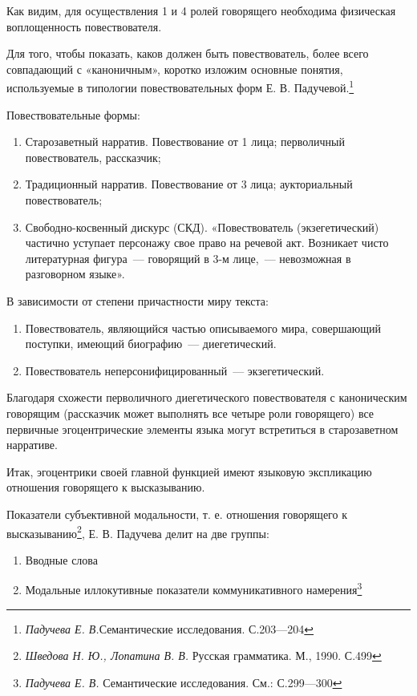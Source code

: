 \documentclass{kursa4}
\begin{document}
{      \bigskip

      Как видим, для осуществления 1 и 4 ролей говорящего необходима физическая воплощенность повествователя. 

      Для того, чтобы показать, каков должен быть повествователь, более всего совпадающий с «каноничным», коротко изложим основные понятия, используемые в типологии повествовательных форм Е. В. Падучевой.\footnote{\textit{Падучева Е. В.}Семантические исследования. С.203—204} \newline

      Повествовательные формы:
      \begin{enumerate}
        \item Старозаветный нарратив. Повествование от 1 лица; перволичный повествователь, рассказчик; 
        \item Традиционный нарратив. Повествование от 3 лица; аукториальный повествователь; \item Свободно-косвенный дискурс (СКД). «Повествователь (экзегетический) частично уступает персонажу свое право на речевой акт. Возникает чисто литературная фигура~--- говорящий в 3-м лице,~--- невозможная в разговорном языке». \end{enumerate}

      В зависимости от степени причастности миру текста: \begin{enumerate}
        \item Повествователь, являющийся частью описываемого мира, совершающий поступки, имеющий биографию~--- диегетический. 
        \item Повествователь неперсонифицированный~--- экзегетический. 
       \end{enumerate} 

      Благодаря схожести перволичного диегетического повествователя с каноническим говорящим (рассказчик может выполнять все четыре роли говорящего) все первичные эгоцентрические элементы языка могут встретиться в старозаветном нарративе. 

      Итак, эгоцентрики своей главной функцией имеют языковую экспликацию отношения говорящего к высказыванию. 

      Показатели субъективной модальности, т. е. отношения говорящего к высказыванию\footnote{\textit{ Шведова Н. Ю., Лопатина В. В.} Русская грамматика. М., 1990. С.499}, Е. В. Падучева делит на две группы: 

      \begin{enumerate}
        \item Вводные слова \item Модальные иллокутивные показатели коммуникативного намерения\footnote{\textit{Падучева Е. В.} Семантические исследования. См.: С.299—300}        
      \end{enumerate}

}
\end{document}
